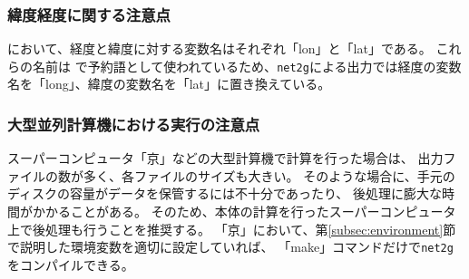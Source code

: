 
\subsubsection{緯度経度に関する注意点}
\scalerm において、経度と緯度に対する変数名はそれぞれ「lon」と「lat」である。
これらの名前は \grads で予約語として使われているため、\verb|net2g|による出力では経度の変数名を「long」、緯度の変数名を「lat」に置き換えている。

\subsubsection{大型並列計算機における実行の注意点}
スーパーコンピュータ「京」などの大型計算機で計算を行った場合は、
出力ファイルの数が多く、各ファイルのサイズも大きい。
そのような場合に、手元のディスクの容量がデータを保管するには不十分であったり、
後処理に膨大な時間がかかることがある。
そのため、\scalerm 本体の計算を行ったスーパーコンピュータ上で後処理も行うことを推奨する。
「京」において、第\ref{subsec:environment}節で説明した環境変数を適切に設定していれば、
「make」コマンドだけで\verb|net2g|をコンパイルできる。




